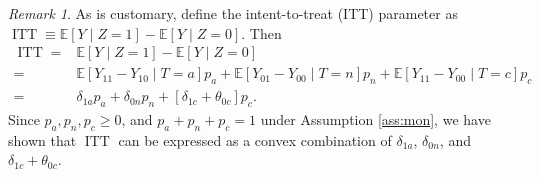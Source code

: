\documentclass[12pt]{article}
\theoremstyle{plain}
\theoremstyle{definition}
\theoremstyle{remark}
\newtheorem{remark}{Remark}%
\begin{document}
\begin{remark}


As is customary, define the intent-to-treat (ITT) parameter as $\operatorname{ITT} \equiv \mathbb{E}[Y \mid Z = 1] - \mathbb{E}[Y \mid Z = 0]$. Then 
\begin{equation*}
    \begin{aligned}
        \operatorname{ITT} =& \mathbb{E}[Y \mid Z = 1] - \mathbb{E}[Y \mid Z = 0] \\
        =& \mathbb{E}[Y_{11} - Y_{10} \mid T = a] p_a + \mathbb{E}[Y_{01} - Y_{00} \mid T = n] p_n + \mathbb{E}[Y_{11} - Y_{00} \mid T = c] p_c \\
        =& \delta_{1a} p_a + \delta_{0n} p_n + \left[ \delta_{1c}+\theta_{0c} \right] p_c.
    \end{aligned}
\end{equation*}
Since $p_a, p_n, p_c \geq 0$, and $p_a + p_n + p_c = 1$ under Assumption \ref{ass:mon}, we have shown that $\operatorname{ITT}$ can be expressed as a convex combination of $\delta_{1a}$, $\delta_{0n}$, and $\delta_{1c}+\theta_{0c}$.
\end{remark}
\end{document}
